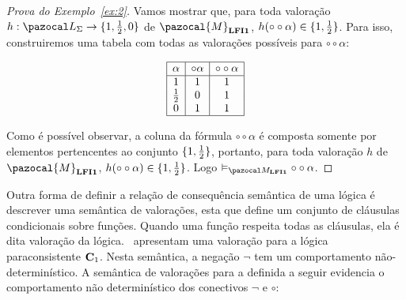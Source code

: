         \begin{proof}[Prova do Exemplo~\ref{ex:2}]
            Vamos mostrar que, para toda valoração $h : \ling{} \to \{1,\meio{},0\}$ de $\pazocal{M}_{\lfium{}}$, $h(\circ \circ \alpha) \in \{1, \frac{1}{2}{}\}$. Para isso, construiremos uma tabela com todas as valorações possíveis para $\circ \circ \alpha$:
            \begin{center}
                \[
                    \begin{array}{|c|c|c|}%
                        \hline
                        \alpha      & \circ \alpha & \circ \circ \alpha   \\
                        \hline%
                        1           & 1            &    1\\
                        \meio{    } & 0            &    1\\
                        0           & 1            &    1\\
                        \hline
                    \end{array}
                \]
            \end{center}

            Como é possível observar, a coluna da fórmula $\circ \circ \alpha$ é composta somente por elementos pertencentes ao conjunto $\{1, \frac{1}{2}{}\}$, portanto, para toda valoração $h$ de $\pazocal{M}_{\lfium{}}$, $h(\circ \circ \alpha) \in \{1, \frac{1}{2}{}\}$. Logo $ \conmat \circ \circ \alpha$.
            
        \end{proof}

        
        Outra forma de definir a relação de consequência semântica de uma lógica é descrever uma semântica de valorações, esta que define um conjunto de cláusulas condicionais sobre funções. Quando uma função respeita todas as cláusulas, ela é dita valoração da lógica.~ apresentam uma valoração para a lógica paraconsistente $\text{\textbf{C}}_{1}$. Nesta semântica, a negação $\neg$ tem um comportamento não-determinístico. A semântica de valorações para a \lfium{} definida a seguir evidencia o comportamento não determinístico dos conectivos $\neg$ e $\circ$:


